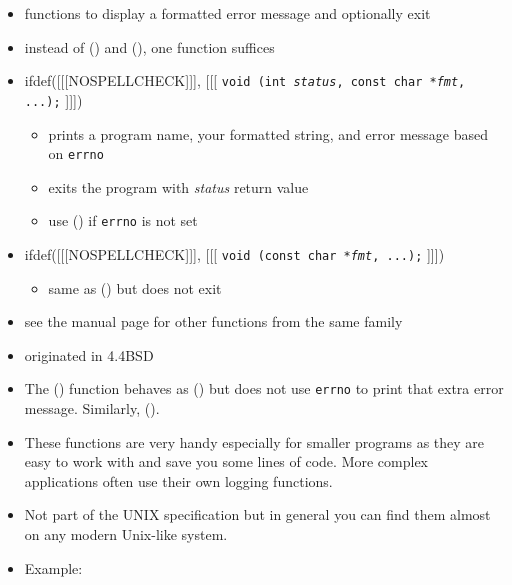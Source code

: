 \begin{slide}
\setlength{\baselineskip}{0.8\baselineskip}
\begin{itemize}
\item functions to display a formatted error message and optionally exit
\item instead of () and (), one function suffices
\item
ifdef([[[NOSPELLCHECK]]], [[[
\texttt{void (int \emph{status}, const char *\emph{fmt}, ...);}
]]])
\begin{itemize}
\item prints a program name, your formatted string, and error message based on
\texttt{errno}
\item exits the program with \emph{status} return value
\item use () if \texttt{errno} is not set
\end{itemize}
\item
ifdef([[[NOSPELLCHECK]]], [[[
\texttt{void (const char *\emph{fmt}, ...);}
]]])
\begin{itemize}
\item same as () but does not exit
\end{itemize}
\item see the manual page for other functions from the same family
\item originated in 4.4BSD
\end{itemize}
\end{slide}


\begin{itemize}
\item The () function behaves as () but does not use
\texttt{errno} to print that extra error message.  Similarly, ().
\item These functions are very handy especially for smaller programs as they are
easy to work with and save you some lines of code.  More complex
app\-li\-ca\-tions often use their own logging functions.
\item Not part of the UNIX specification but in general you can find them almost
on any modern Unix-like system.
\item Example: 
\end{itemize}

\endinput
